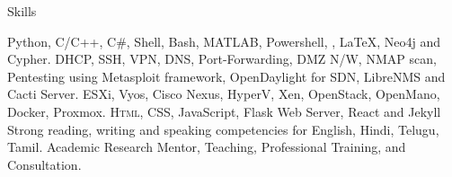 
\begin{rubric}{Skills}

%	
	Python, C/C++, C\#, Shell, Bash, \textsc{MATLAB}, Powershell, , \LaTeX, Neo4j and Cypher. 
%	
	DHCP, SSH, VPN, DNS, Port-Forwarding, DMZ N/W, NMAP scan, Pentesting using Metasploit framework, OpenDaylight for SDN, LibreNMS and Cacti Server.
%	
%	
\entry*[Virtualization]
	ESXi, Vyos, Cisco Nexus, HyperV, Xen, OpenStack, OpenMano, Docker, Proxmox.
%	
	\textsc{Html, CSS}, JavaScript, Flask Web Server, React and Jekyll
%
\entry*[Languages]
	Strong reading, writing and speaking competencies for English, Hindi, Telugu, Tamil.
%	
\entry*[Misc.]
	Academic Research Mentor, Teaching, Professional Training, and Consultation.
\end{rubric}
